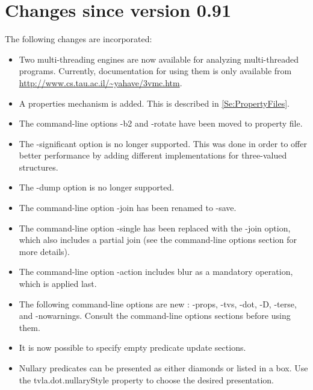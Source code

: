 \section{Changes since version 0.91}

The following changes are incorporated:
\begin{itemize}
\item Two multi-threading engines are now available for analyzing
multi-threaded programs. Currently, documentation for using them
is only available from
\url{http://www.cs.tau.ac.il/~yahave/3vmc.htm}.


\item A properties mechanism is added. This is described in
\ref{Se:PropertyFiles}.

\item The command-line options -b2 and -rotate have been moved to
property file.

\item The -significant option is no longer supported. This was
done in order to offer better performance by adding different
implementations for three-valued structures.

\item The -dump option is no longer supported.

\item The command-line option -join has been renamed to -save.

\item The command-line option -single has been replaced with the
-join option, which also includes a partial join (see the
command-line options section for more details).

\item The command-line option -action includes blur as a mandatory
operation, which is applied last.

\item The following command-line options are new :
-props, -tvs, -dot, -D, -terse,  and -nowarnings. Consult the
command-line options sections before using them.

\item It is now possible to specify empty predicate update
sections.

\item Nullary predicates can be presented as either diamonds or
listed in a box. Use the tvla.dot.nullaryStyle property to choose
the desired presentation.

\end{itemize}
